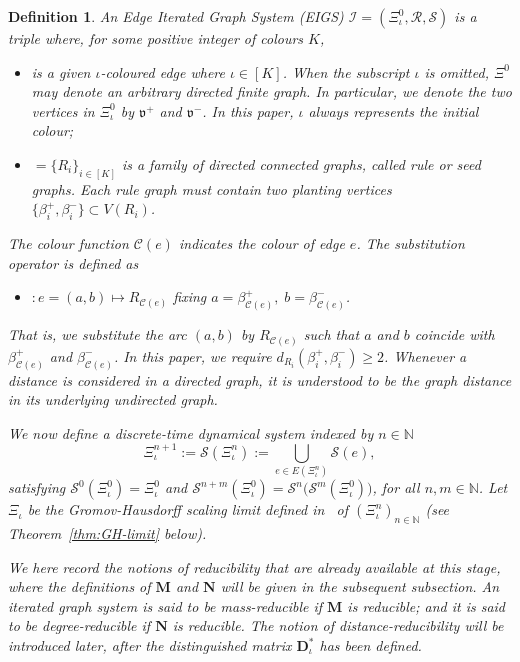 \documentclass[12pt]{iopart}
\newtheorem{definition}[theorem]{Definition}
\newcommand*{\dist}{d}
\begin{document}
\begin{definition}
An {\em Edge Iterated Graph System} (EIGS) $\mathscr{I}=(\Xi_{\iota}^0,\mathcal{R},\mathcal{S})$ is a triple where, 
for some positive integer of colours $K$,
\begin{itemize}
    \item[$\Xi_{\iota}^0$] is a given $\iota$-coloured edge where $\iota \in [K]$. 
          When the subscript $\iota$ is omitted, $\Xi^{0}$ may denote an arbitrary directed finite graph.
          In particular, we denote the two vertices in $\Xi_\iota^0$ by $\mathfrak{v}^+$ and $\mathfrak{v}^-$.
          In this paper, $\iota$ always represents the initial colour;
    \item[$\mathcal{R}$] $=\{R_i\}_{i \in [K]}$ is a family of directed connected graphs, 
          called {\em rule} or {\em seed graphs}. 
          Each rule graph must contain two {\em planting vertices} $\{\beta_i^+, \beta_i^-\}\subset V(R_i)$.
\end{itemize}
The colour function $\mathscr{C}(e)$ indicates the colour of edge $e$.
The substitution operator is defined as 
\begin{itemize}
    \item[$\displaystyle\mathcal{S}$] $: e=(a,b) \mapsto R_{\mathscr{C}(e)}$ 
          fixing $a = \beta_{\mathscr{C}(e)}^+,\; b = \beta_{\mathscr{C}(e)}^-$.
\end{itemize}
That is, we substitute the arc $(a,b)$ by $R_{\mathscr{C}(e)}$ such that 
$a$ and $b$ coincide with $\beta_{\mathscr{C}(e)}^+$ and $\beta_{\mathscr{C}(e)}^-$.
In this paper, we require $\dist_{R_i}(\beta_i^+,\beta_i^-) \geq 2$.
Whenever a distance is considered in a directed graph, it is understood to be the graph distance in its underlying undirected graph.

We now define a discrete-time dynamical system indexed by $n\in\mathbb{N}$
\[
\Xi_{\iota}^{n+1}:=\mathcal{S}(\Xi_{\iota}^n):=\bigcup_{e \in E(\Xi_{\iota}^n)} \mathcal{S}(e)  ,
\]
satisfying $\mathcal{S}^0(\Xi_{\iota}^0) = \Xi_{\iota}^0$ 
and $\mathcal{S}^{n+m}(\Xi_{\iota}^0) = \mathcal{S}^n\big(\mathcal{S}^m(\Xi_{\iota}^0)\big)$, 
for all $n,m\in\mathbb{N}$.
Let $\Xi_{\iota}$ be the Gromov-Hausdorff scaling limit defined in~\cite{neroli2024fractal}
of $(\Xi_{\iota}^n)_{n\in\mathbb{N}}$ (see Theorem~\ref{thm:GH-limit} below). 

We here record the notions of reducibility that are already available at this stage, 
where the definitions of $\mathbf{M}$ and $\mathbf{N}$ will be given in the subsequent subsection.
An iterated graph system is said to be {\em mass-reducible} if $\mathbf{M}$ is reducible; 
and it is said to be {\em degree-reducible} if $\mathbf{N}$ is reducible.
The notion of distance-reducibility will be introduced later, after the distinguished matrix $\mathbf D_\iota^*$ has been defined.
\end{definition}
\end{document}
